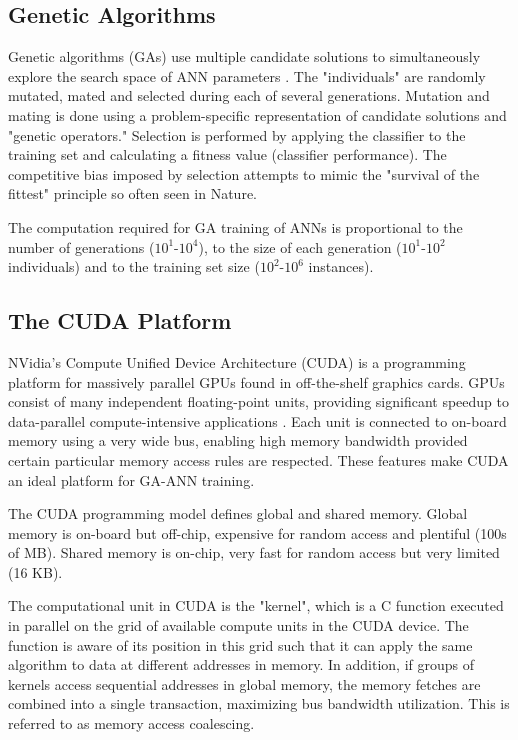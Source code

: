 \documentclass[11pt]{article}       %
\begin{document}
\subsection{Genetic Algorithms} \label{ga}
Genetic algorithms (GAs) use multiple candidate solutions to simultaneously explore the search space of ANN parameters \cite{GA-ANN}. The "individuals" are randomly mutated, mated and selected during each of several generations. Mutation and mating is done using a problem-specific representation of candidate solutions and "genetic operators." Selection is performed by applying the classifier to the training set and calculating a fitness value (classifier performance). The competitive bias imposed by selection attempts to mimic the "survival of the fittest" principle so often seen in Nature.

The computation required for GA training of ANNs is proportional to the number of generations ($10^1$-$10^4$), to the size of each generation ($10^1$-$10^2$ individuals) and to the training set size ($10^2$-$10^6$ instances).

\subsection{The CUDA Platform} \label{cuda}
NVidia's Compute Unified Device Architecture (CUDA) is a programming platform for massively parallel GPUs found in off-the-shelf graphics cards. GPUs consist of many independent floating-point units, providing significant speedup to data-parallel compute-intensive applications \cite{cuda}. Each unit is connected to on-board memory using a very wide bus, enabling high memory bandwidth provided certain particular memory access rules are respected. These features make CUDA an ideal platform for GA-ANN training.

The CUDA programming model defines global and shared memory. Global memory is on-board but off-chip, expensive for random access and plentiful (100s of MB). Shared memory is on-chip, very fast for random access but very limited (16 KB).

The computational unit in CUDA is the "kernel", which is a C function executed in parallel on the grid of available compute units in the CUDA device. The function is aware of its position in this grid such that it can apply the same algorithm to data at different addresses in memory. In addition, if groups of kernels access sequential addresses in global memory, the memory fetches are combined into a single transaction, maximizing bus bandwidth utilization. This is referred to as memory access coalescing.
\end{document}
